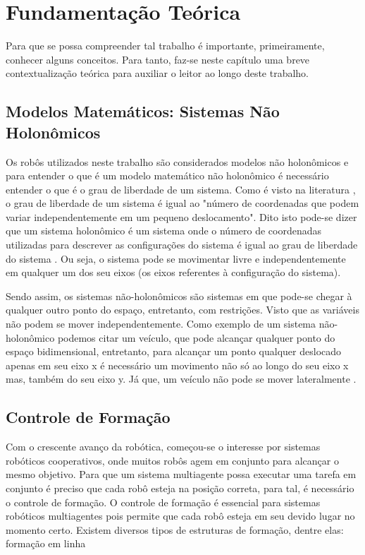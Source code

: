 %
%

\chapter{Fundamentação Teórica}
\label{chap:fundamentacaoTeorica}
Para que se possa %
compreender tal trabalho é importante, primeiramente, conhecer alguns conceitos. Para tanto, faz-se neste capítulo uma breve contextualização teórica para auxiliar o leitor ao longo deste trabalho. 

\section{Modelos Matemáticos: Sistemas Não Holonômicos}
\label{sec:modeloMatematicoNHolonomico}
Os robôs utilizados neste trabalho são considerados modelos não holonômicos e para entender o que é um modelo matemático não holonômico é necessário entender o que é o grau de liberdade de um sistema. Como é visto na literatura \cite{TJRD13}, o grau de liberdade de um sistema é igual ao "número de coordenadas que podem variar independentemente em um pequeno deslocamento". Dito isto pode-se dizer que um sistema holonômico é um sistema onde o número de coordenadas utilizadas para descrever as configurações do sistema é igual ao grau de liberdade do sistema \cite{TJRD13}. Ou seja, o sistema pode se movimentar livre e independentemente em qualquer um dos seu eixos (os eixos referentes à configuração do sistema).

Sendo assim, os sistemas não-holonômicos são sistemas em que pode-se chegar à qualquer outro ponto do espaço, entretanto, com restrições. Visto que as variáveis não podem se mover independentemente. Como exemplo de um sistema não-holonômico podemos citar um veículo, que pode alcançar qualquer ponto do espaço bidimensional, entretanto, para alcançar um ponto qualquer deslocado apenas em seu eixo x é necessário um movimento não só ao longo do seu eixo x mas, também do seu eixo y. Já que, um veículo não pode se mover lateralmente \cite{GJA11}.

\section{Controle de Formação}
\label{sec:controleFormacao}
Com o crescente avanço da robótica, começou-se o interesse por sistemas robóticos cooperativos, onde muitos robôs agem em conjunto para alcançar o mesmo objetivo. Para que um sistema multiagente possa executar uma tarefa em conjunto é preciso que cada robô esteja na posição correta, para tal, é necessário o controle de formação. O controle de formação é essencial para sistemas robóticos multiagentes pois permite que cada robô esteja em seu devido lugar no momento certo. Existem diversos tipos de estruturas de formação, dentre elas: formação em linha 

